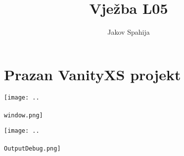 
\usepackage{hyperref}
\usepackage[perpage,bottom]{footmisc}

\newcommand{\basedir}{~/FESB/2. semestar/3D Simulacije/Izvještaji/vjezba6}
\title{Vježba L05}
\author{Jakov Spahija}


\maketitle
\vspace{15em}
\tableofcontents
\pagebreak

\section{Prazan VanityXS projekt}
\label{sec:UWP}
\setcounter{lstlisting}{0}

%	

\texttt{[image: ..\\\\window.png]}

\vspace{3em}
\texttt{[image: ..\\\\OutputDebug.png]}

\pagebreak


